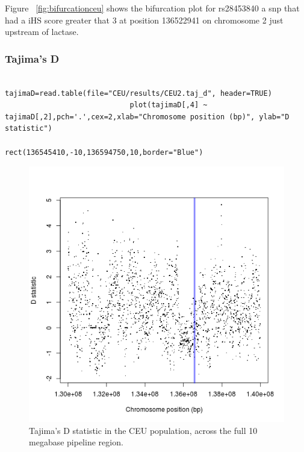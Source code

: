 \documentclass[a4paper,10pt]{article}
\begin{document}
                             \noindent
                             Figure ~\ref{fig:bifurcationceu} shows the bifurcation plot for rs28453840 a snp that had a iHS score greater that 3 at position 136522941 on chromosome 2 just upstream of lactase.

                             \subsubsection{Tajima's D}

                             \begin{verbatim}
                             tajimaD=read.table(file="CEU/results/CEU2.taj_d", header=TRUE)
                             plot(tajimaD[,4] ~ tajimaD[,2],pch='.',cex=2,xlab="Chromosome position (bp)", ylab="D statistic")
                             rect(136545410,-10,136594750,10,border="Blue") 
                             \end{verbatim}

                             \begin{figure}
                             \centering
                             \includegraphics{pictures/CEUtajimas.png}
                             \caption{Tajima's D statistic in the CEU population, across the full 10 megabase pipeline region.}
                             \label{fig:tajceu}
                             \end{figure}
\end{document}
